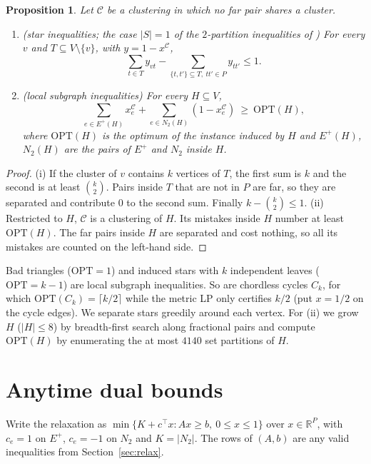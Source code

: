 \documentclass[11pt]{article}
\newtheorem{proposition}[theorem]{Proposition}
\theoremstyle{definition}
\newcommand{\OPT}{\mathrm{OPT}}
\newcommand{\Ep}{E^{+}}
\newcommand{\Nt}{N_{2}}
\newcommand{\R}{\mathbb{R}}
\begin{document}
\begin{proposition}\label{prop:subgraph}
Let $\mathcal C$ be a clustering in which no far pair shares a cluster.
\begin{enumerate}
\item[(i)] (star inequalities; the case $|S|=1$ of the $2$-partition
inequalities of \citet{GrotschelW89}) For every $v$ and $T\subseteq V\setminus\{v\}$, with
$y=1-x^{\mathcal C}$,
\[\textstyle\sum_{t\in T}y_{vt}-\sum_{\{t,t'\}\subseteq T,\ tt'\in P}y_{tt'}\le 1.\]
\item[(ii)] (local subgraph inequalities) For every $H\subseteq V$,
\[\textstyle\sum_{e\in\Ep(H)}x^{\mathcal C}_e+\sum_{e\in\Nt(H)}(1-x^{\mathcal C}_e)\ \ge\ \OPT(H),\]
where $\OPT(H)$ is the optimum of the instance induced by $H$ and $\Ep(H)$,
$\Nt(H)$ are the pairs of $\Ep$ and $\Nt$ inside $H$.
\end{enumerate}
\end{proposition}
\begin{proof}
(i) If the cluster of $v$ contains $k$ vertices of $T$, the first sum is $k$
and the second is at least $\binom k2$.  Pairs inside $T$ that are not in $P$
are far, so they are separated and contribute $0$ to the second sum.
Finally $k-\binom k2\le1$.  (ii) Restricted to $H$, $\mathcal C$ is a clustering
of $H$.  Its mistakes inside $H$ number at least $\OPT(H)$.  The far pairs
inside $H$ are separated and cost nothing, so all its mistakes are counted
on the left-hand side.
\end{proof}

Bad triangles ($\OPT=1$) and induced stars with $k$ independent leaves
($\OPT=k-1$) are local subgraph inequalities.  So are chordless cycles $C_k$,
for which $\OPT(C_k)=\lceil k/2\rceil$ while the metric LP only certifies
$k/2$ (put $x=1/2$ on the cycle edges).  We separate stars greedily around
each vertex.  For (ii) we grow $H$ ($|H|\le 8$) by breadth-first search along
fractional pairs and compute $\OPT(H)$ by enumerating the at most $4140$
set partitions of $H$.

\section{Anytime dual bounds}\label{sec:dual}

Write the relaxation as $\min\{K+c^\top x: Ax\ge b,\ 0\le x\le 1\}$ over
$x\in\R^P$, with $c_e=1$ on $\Ep$, $c_e=-1$ on $\Nt$ and $K=|\Nt|$.  The rows
of $(A,b)$ are any valid inequalities from Section~\ref{sec:relax}.
\end{document}
